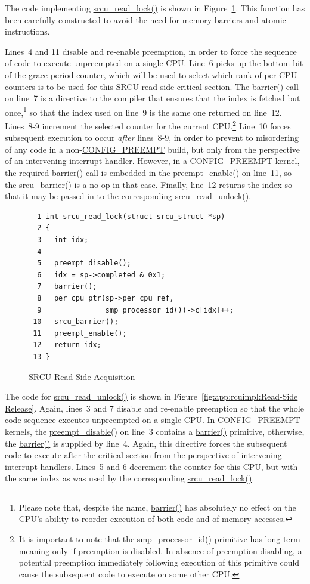 The code implementing \url{srcu_read_lock()} is shown in
Figure~\ref{fig:app:rcuimpl:Read-Side Acquisition}.
This function has been carefully constructed to avoid the
need for memory barriers and atomic instructions.

Lines~4 and 11 disable and re-enable preemption, in order to force
the sequence of code to execute unpreempted on a single CPU.
Line~6 picks up the bottom bit of the grace-period counter, which will
be used to select which rank of per-CPU counters is to be used for this
SRCU read-side critical section.
The \url{barrier()} call on line~7 is a directive to the compiler
that ensures that the index is
fetched but once,\footnote{
	Please note that, despite the name, \url{barrier()}
	has absolutely no effect on the CPU's ability to
	reorder execution of both code and of memory accesses.}
so that the index used on line~9 is the same
one returned on line~12.
Lines~8-9 increment the selected counter for the current CPU.\footnote{
	It is important to note that the \url{smp_processor_id()} primitive
	has long-term meaning only if preemption is disabled.
	In absence of preemption disabling, a potential preemption
	immediately following execution of this primitive could
	cause the subsequent code to execute on some other CPU.}
Line~10 forces subsequent execution to occur \emph{after}
lines~8-9, in order to prevent to misordering of any code
in a non-\url{CONFIG_PREEMPT} build, but only
from the perspective of an intervening interrupt handler.
However, in a \url{CONFIG_PREEMPT} kernel, the required \url{barrier()}
call is embedded in the \url{preempt_enable()} on line~11, so the
\url{srcu_barrier()} is a no-op in that case.
Finally, line~12 returns the index so that it may be passed in to the
corresponding \url{srcu_read_unlock()}.

\begin{figure}[htbp]
{ \scriptsize
\begin{verbatim}
  1 int srcu_read_lock(struct srcu_struct *sp)
  2 {
  3   int idx;
  4
  5   preempt_disable();
  6   idx = sp->completed & 0x1;
  7   barrier();
  8   per_cpu_ptr(sp->per_cpu_ref,
  9               smp_processor_id())->c[idx]++;
 10   srcu_barrier();
 11   preempt_enable();
 12   return idx;
 13 }
\end{verbatim}
}
\caption{SRCU Read-Side Acquisition}
\label{fig:app:rcuimpl:Read-Side Acquisition}
\end{figure}

The code for \url{srcu_read_unlock()} is shown in
Figure~\ref{fig:app:rcuimpl:Read-Side Release}.
Again, lines~3 and 7 disable and re-enable preemption so that the
whole code sequence executes unpreempted on a single CPU.
In \url{CONFIG_PREEMPT} kernels, the \url{preempt_disable()} on line~3
contains a \url{barrier()} primitive, otherwise, the \url{barrier()}
is supplied by line~4.
Again, this directive forces the subsequent code to execute after
the critical section from the perspective of intervening
interrupt handlers.
Lines~5 and 6 decrement the counter for this CPU, but with the same
index as was used by the corresponding \url{srcu_read_lock()}.

